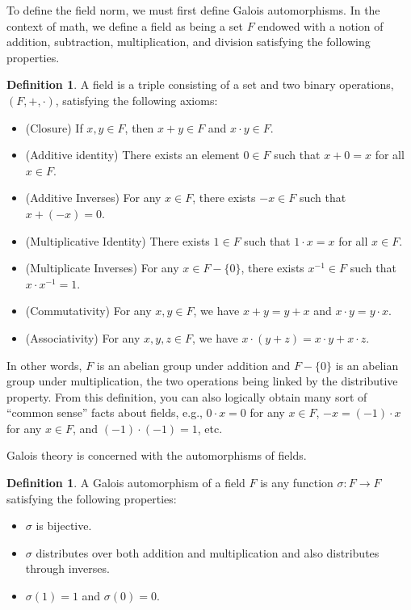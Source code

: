 \documentclass[12pt]{amsart}
\theoremstyle{definition}
\newtheorem{definition}[theorem]{Definition}
\begin{document}
	To define the field norm, we must first define Galois automorphisms. In the context of math, we define a field as being a set $F$ endowed with a notion of addition, subtraction, multiplication, and division satisfying the following properties.
	\begin{definition}\label{D:3:1}
		A field is a triple consisting of a set and two binary operations, $(F,+,\cdot)$, satisfying the following axioms:
	
	\begin{itemize}
		\item[1.] (Closure) If $x, y \in F$, then $x + y \in F$ and $x \cdot y \in F$.
		\item[2.] (Additive identity) There exists an element $0 \in F$ such that $x + 0 = x$ for all $x \in F$.
		\item[3.] (Additive Inverses) For any $x \in F$, there exists $-x \in F$ such that $x + (-x) = 0$.
		\item[4.] (Multiplicative Identity) There exists $1 \in F$ such that $1 \cdot x = x$ for all $x \in F$.
		\item[5.] (Multiplicate Inverses) For any $x \in F - \{0\}$, there exists $x^{-1} \in F$ such that $x\cdot x^{-1} = 1$.
		\item[6.] (Commutativity) For any $x,y \in F$, we have $x + y = y + x$ and $x\cdot y = y \cdot x$.
		\item[7.] (Associativity) For any $x,y,z \in F$, we have $x\cdot (y + z) = x\cdot y + x\cdot z$.
	\end{itemize}
	\end{definition}
	
	In other words, $F$ is an abelian group under addition and $F - \{0\}$ is an abelian group under multiplication, the two operations being linked by the distributive property. From this definition, you can also logically obtain many sort of ``common sense'' facts about fields, e.g., $0\cdot x = 0$ for any $x \in F$, $-x = (-1)\cdot x$ for any $x \in F$, and $(-1)\cdot (-1) = 1$, etc.
	
	Galois theory is concerned with the automorphisms of fields. 
	
	\begin{definition}\label{D:3:2}
	A Galois automorphism of a field $F$ is any function $\sigma: F \to F$ satisfying the following properties:
	\begin{itemize}
		\item[1.] $\sigma$ is bijective.
		\item[2.] $\sigma$ distributes over both addition and multiplication and also distributes through inverses.
		\item[3.] $\sigma(1) = 1$ and $\sigma(0) = 0$.
	\end{itemize}
	\end{definition}
\end{document}
